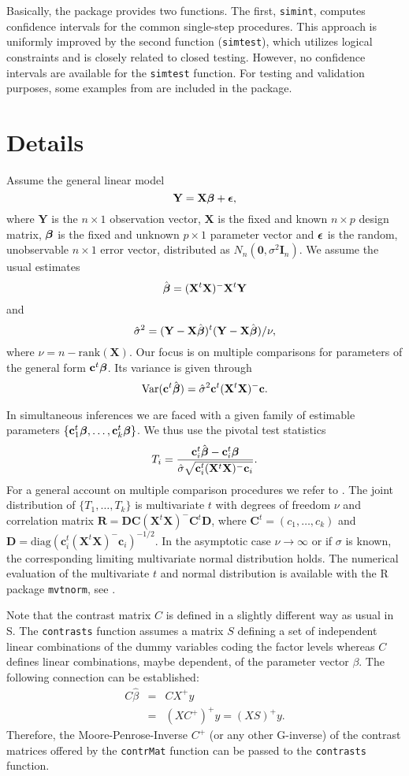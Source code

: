 \documentclass{article}
\newcommand{\bbeta}{\mbox{\boldmath $\beta$}}
\newcommand{\bepsilon}{\mbox{\boldmath $\epsilon$}}
\newcommand{\bc}{{\mathbf{c}}}
\newcommand{\bC}{{\mathbf{C}}}
\newcommand{\bD}{{\mathbf{D}}}
\newcommand{\bI}{{\mathbf{I}}}
\newcommand{\bR}{{\mathbf{R}}}
\newcommand{\bX}{{\mathbf{X}}}
\newcommand{\bY}{{\mathbf{Y}}}
\newcommand{\bzero}{{\mathbf{0}}}
\begin{document}
Basically, the package provides two functions. The first, \texttt{simint}, computes 
confidence
intervals for the common single-step procedures.
This approach is uniformly improved by the second function
(\texttt{simtest}), which utilizes logical constraints and is
closely related to closed testing. However, no confidence
intervals are available for the \texttt{simtest} function. 
For testing and validation purposes, some 
examples from \cite{multiple-c:1999} are included in the package.

\section{Details}

Assume the general linear model
$$
\bY = \bX \bbeta + \bepsilon,
$$
where $\bY$ is the $n \times 1$ observation vector, $\bX$ is the
fixed and known $n\times p$ design matrix, $\bbeta$ is the fixed
and unknown $p \times 1$ parameter vector and $\bepsilon$ is the
random, unobservable $n \times 1$ error vector, distributed as
$N_n(\bzero, \sigma^2\bI_n)$. We assume the usual estimates
$$
\hat{\bbeta} = (\bX^t \bX)^-\bX^t\bY
$$
and
$$
\hat{\sigma}^2 = (\bY-\bX\hat{\bbeta})^t(\bY-\bX\hat{\bbeta})/\nu,
$$
where $\nu = n - \mbox{rank}(\bX)$. Our focus is on multiple
comparisons for parameters of the general form $\bc^t \bbeta$.
Its variance is given through
$$
\mbox{Var}(\bc^t \hat{\bbeta}) = \hat{\sigma}^2\bc^t(\bX^t \bX)^-\bc.
$$

In simultaneous inferences we are faced with a given family of
estimable parameters $\{\bc_1^t \bbeta, \ldots, \bc_k^t \bbeta\}$.
We thus use the pivotal test statistics
$$
T_i = \frac{\bc_i^t \hat{\bbeta}-\bc_i^t
\bbeta}{\hat{\sigma}\sqrt{\bc_i^t(\bX^t \bX)^-\bc_i}}.
$$
For a general account on multiple comparison procedures we refer
to \cite{HochbergTamhane:1987}. The joint distribution of $\{T_1,
\ldots, T_k\}$ is multivariate $t$ with degrees of freedom $\nu$
and correlation matrix $\bR = \bD\bC(\bX^t \bX)^-\bC^t\bD$, where
$\bC^t = (c_1, \ldots, c_k)$ and $\bD = \mbox{diag}(\bc_i^t(\bX^t
\bX)^-\bc_i)^{-1/2}$. In the asymptotic case $\nu \rightarrow
\infty$ or if $\sigma$ is known, the corresponding limiting
multivariate normal distribution holds. The numerical evaluation
of the multivariate $t$ and normal distribution is available with
the \textsf{R} package \texttt{mvtnorm}, see \cite{hothornetal:2001}.

Note that the contrast matrix $C$ is defined in a slightly different way as
usual in \textsf{S}. The \texttt{contrasts} function assumes a matrix $S$
defining a set of independent linear combinations of the dummy variables
coding the factor levels whereas $C$ defines linear combinations, maybe
dependent, of the parameter vector $\beta$.
The following connection can be established:
\begin{eqnarray*}
C \hat{\beta} & = & C X^+ y \\
& = & (X C^+)^+ y = (XS)^+ y.
\end{eqnarray*}
Therefore, the Moore-Penrose-Inverse $C^+$ (or any other G-inverse) of the
contrast matrices offered by the \texttt{contrMat} function can be passed to
the \texttt{contrasts} function.
\end{document}
